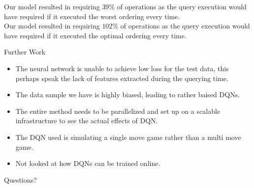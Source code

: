 \begin{frame}
    Our model resulted in requiring $39\%$ of operations as the query execution would have required if it executed the worst ordering every time.\\
    Our model resulted in requiring $102\%$ of operations as the query execution would have required if it executed the optimal ordering every time.\\
\end{frame}

\begin{frame}{Further Work}
    \begin{itemize}[<+->]
        \item The neural network is unable to achieve low loss for the test data, this perhaps speak the lack of features extracted during the querying time.
        \item The data sample we have is highly biased, leading to rather baised DQNs.
        \item The entire method needs to be parallelized and set up on a scalable infrastructure to see the actual effects of DQN.
        \item The DQN used is simulating a single move game rather than a multi move game.
        \item Not looked at how DQNs can be trained online.
    \end{itemize}
\end{frame}

\begin{frame}{}
    Questions?
\end{frame}

